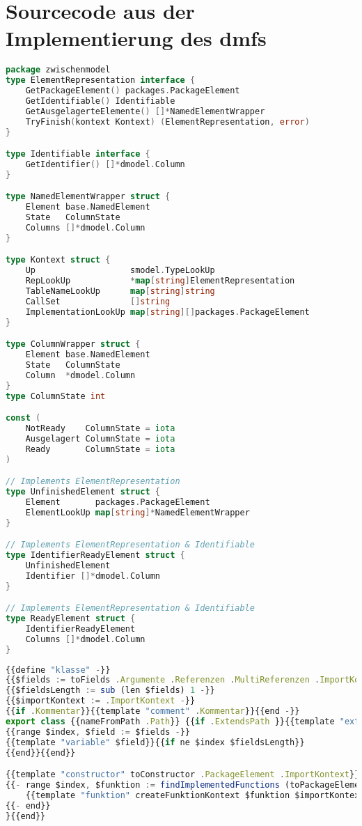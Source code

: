 \documentclass[./einleitung.tex]{subfiles}
\begin{document}
    \section{Sourcecode aus der Implementierung des \acrshort{dmf}s}\label{sec:dateien-aus-der-implementierung-des-dmfs}
    \begin{lstlisting}[language=Go, caption=Zwischenmodell für die Datenbankmodell-Generation ohne Implementierung der Methoden, label=zmodel]
package zwischenmodel
type ElementRepresentation interface {
	GetPackageElement() packages.PackageElement
	GetIdentifiable() Identifiable
	GetAusgelagerteElemente() []*NamedElementWrapper
	TryFinish(kontext Kontext) (ElementRepresentation, error)
}

type Identifiable interface {
	GetIdentifier() []*dmodel.Column
}

type NamedElementWrapper struct {
	Element base.NamedElement
	State   ColumnState
	Columns []*dmodel.Column
}

type Kontext struct {
	Up                   smodel.TypeLookUp
	RepLookUp            *map[string]ElementRepresentation
	TableNameLookUp      map[string]string
	CallSet              []string
	ImplementationLookUp map[string][]packages.PackageElement
}

type ColumnWrapper struct {
	Element base.NamedElement
	State   ColumnState
	Column  *dmodel.Column
}
type ColumnState int

const (
	NotReady    ColumnState = iota
	Ausgelagert ColumnState = iota
	Ready       ColumnState = iota
)

// Implements ElementRepresentation
type UnfinishedElement struct {
	Element       packages.PackageElement
	ElementLookUp map[string]*NamedElementWrapper
}

// Implements ElementRepresentation & Identifiable
type IdentifierReadyElement struct {
	UnfinishedElement
	Identifier []*dmodel.Column
}

// Implements ElementRepresentation & Identifiable
type ReadyElement struct {
	IdentifierReadyElement
	Columns []*dmodel.Column
}
    \end{lstlisting}
    \begin{lstlisting}[language=Typescript, caption=Template für die Generierung einer TypeScript Klasse, label=lst:templateTsKlasse]
{{define "klasse" -}}
{{$fields := toFields .Argumente .Referenzen .MultiReferenzen .ImportKontext -}}
{{$fieldsLength := sub (len $fields) 1 -}}
{{$importKontext := .ImportKontext -}}
{{if .Kommentar}}{{template "comment" .Kommentar}}{{end -}}
export class {{nameFromPath .Path}} {{if .ExtendsPath }}{{template "extends" pathType .ExtendsPath .ImportKontext}}~\\~{{end}}{{if .ImplementsPaths}}{{template "implements" computeImplementNames .ImplementsPaths .ImportKontext}} {{end}}{
{{range $index, $field := $fields -}}
{{template "variable" $field}}{{if ne $index $fieldsLength}}
{{end}}{{end}}

{{template "constructor" toConstructor .PackageElement .ImportKontext}}
{{- range $index, $funktion := findImplementedFunctions (toPackageElement .EntityElement) }}
    {{template "funktion" createFunktionKontext $funktion $importKontext}}
{{- end}}
}{{end}}
    \end{lstlisting}
\end{document}
